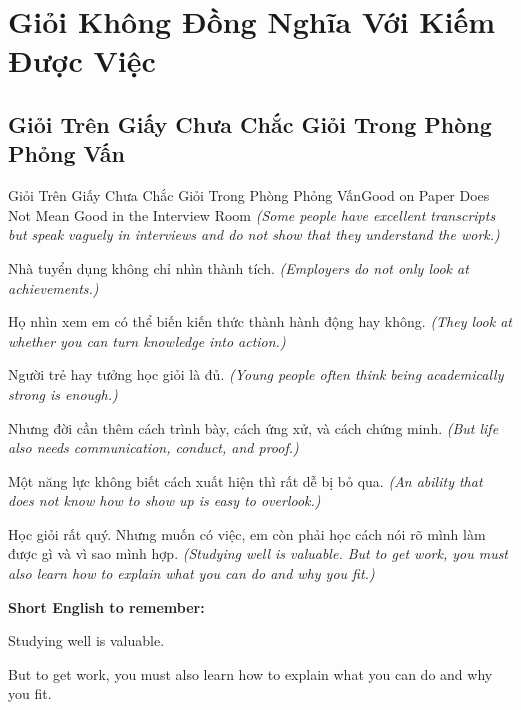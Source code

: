 \chapter{Giỏi Không Đồng Nghĩa Với Kiếm Được Việc}

\section{Giỏi Trên Giấy Chưa Chắc Giỏi Trong Phòng Phỏng Vấn}
\begin{truyen}{Giỏi Trên Giấy Chưa Chắc Giỏi Trong Phòng Phỏng Vấn}{Good on Paper Does Not Mean Good in the Interview Room}
\textit{(Some people have excellent transcripts but speak vaguely in interviews and do not show that they understand the work.)}

Nhà tuyển dụng không chỉ nhìn thành tích.
\textit{(Employers do not only look at achievements.)}

Họ nhìn xem em có thể biến kiến thức thành hành động hay không.
\textit{(They look at whether you can turn knowledge into action.)}

Người trẻ hay tưởng học giỏi là đủ.
\textit{(Young people often think being academically strong is enough.)}

Nhưng đời cần thêm cách trình bày, cách ứng xử, và cách chứng minh.
\textit{(But life also needs communication, conduct, and proof.)}

Một năng lực không biết cách xuất hiện thì rất dễ bị bỏ qua.
\textit{(An ability that does not know how to show up is easy to overlook.)}

\end{truyen}

\begin{baihoc}
Học giỏi rất quý. Nhưng muốn có việc, em còn phải học cách nói rõ mình làm được gì và vì sao mình hợp.
\textit{(Studying well is valuable. But to get work, you must also learn how to explain what you can do and why you fit.)}
\end{baihoc}

\begin{ghinhoanh}
\textbf{Short English to remember:}

Studying well is valuable.

But to get work, you must also learn how to explain what you can do and why you fit.

\end{ghinhoanh}

